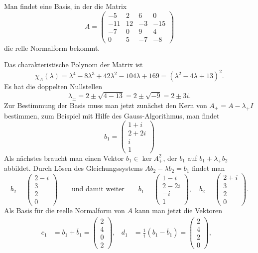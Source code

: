 Man findet eine Basis, in der die Matrix
\[
A=\begin{pmatrix}
 -5&  2&  6&   0\\
-11& 12& -3& -15\\
 -7&  0&  9&   4\\
  0&  5& -7&  -8
\end{pmatrix}
\]
die relle Normalform bekommt.

\begin{loesung}
Das charakteristische Polynom der Matrix ist 
\[
\chi_{A}(\lambda)
=
\lambda^4-8\lambda^3+42\lambda^2-104\lambda+169
=
(\lambda^2-4\lambda+13)^2.
\]
Es hat die doppelten Nullstellen
\[
\lambda_\pm
=
2\pm \sqrt{4-13}
=
2\pm \sqrt{-9}
=
2\pm 3i.
\]
Zur Bestimmung der Basis muss man jetzt zunächst den Kern von 
$A_+=A-\lambda_+I$ bestimmen, zum Beispiel mit Hilfe des Gauss-Algorithmus,
man findet
\[
b_1
=
\begin{pmatrix}
1+i\\
2+2i\\
i\\
1
\end{pmatrix}
\]
Als nächstes braucht man einen Vektor $b_1\in \ker A_+^2$, der 
$b_1$ auf $b_1+\lambda_+b_2$ abbildet.
Durch Lösen des Gleichungssystems $Ab_2-\lambda b_2=b_1$ findet man
\[
b_2
=
\begin{pmatrix}
2-i\\3\\2\\0
\end{pmatrix}
\qquad\text{und damit weiter}\qquad
\overline{b}_1
=
\begin{pmatrix}
1-i\\
2-2i\\
-i\\
1
\end{pmatrix},\quad
\overline{b}_2
=
\begin{pmatrix}
2+i\\3\\2\\0
\end{pmatrix}.
\]
Als Basis für die reelle Normalform von $A$ kann man jetzt die Vektoren
\begin{align*}
c_1
&=
b_1+\overline{b}_1 = \begin{pmatrix}2\\4\\0\\2\end{pmatrix},&
d_1
&=
\frac{1}{i}(b_1-\overline{b}_1) = \begin{pmatrix}2\\4\\2\\0\end{pmatrix},&

\end{align*}
\end{loesung}
